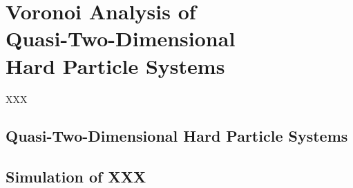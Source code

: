 \chapter[Voronoi Analysis of Quasi\--Two\--Dimensional Hard Particle Systems]{Voronoi Analysis of \\ Quasi\--Two\--Dimensional \\ Hard Particle Systems} 
\label{ch:quasi2d}

\begin{chapterabstract}
XXX
\end{chapterabstract}

\section{Quasi\--Two\--Dimensional Hard Particle Systems}

\section{Simulation of XXX}


